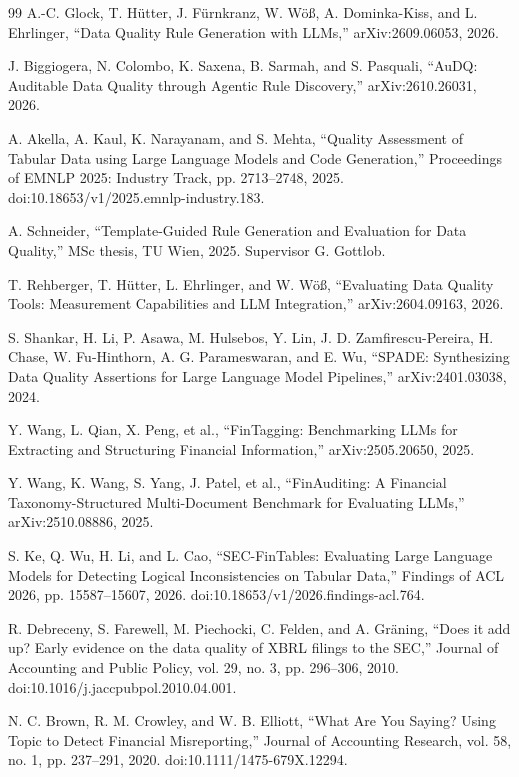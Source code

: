 \documentclass[11pt,a4paper]{article}
\begin{document}
\begin{thebibliography}{99}
 A.-C. Glock, T. H\"utter, J. F\"urnkranz, W. W\"o{\ss}, A. Dominka-Kiss, and L. Ehrlinger, ``Data Quality Rule Generation with LLMs,'' arXiv:2609.06053, 2026.

 J. Biggiogera, N. Colombo, K. Saxena, B. Sarmah, and S. Pasquali, ``AuDQ: Auditable Data Quality through Agentic Rule Discovery,'' arXiv:2610.26031, 2026.

 A. Akella, A. Kaul, K. Narayanam, and S. Mehta, ``Quality Assessment of Tabular Data using Large Language Models and Code Generation,'' Proceedings of EMNLP 2025: Industry Track, pp. 2713--2748, 2025. doi:10.18653/v1/2025.emnlp-industry.183.

 A. Schneider, ``Template-Guided Rule Generation and Evaluation for Data Quality,'' MSc thesis, TU Wien, 2025. Supervisor G. Gottlob.

 T. Rehberger, T. H\"utter, L. Ehrlinger, and W. W\"o{\ss}, ``Evaluating Data Quality Tools: Measurement Capabilities and LLM Integration,'' arXiv:2604.09163, 2026.

 S. Shankar, H. Li, P. Asawa, M. Hulsebos, Y. Lin, J. D. Zamfirescu-Pereira, H. Chase, W. Fu-Hinthorn, A. G. Parameswaran, and E. Wu, ``SPADE: Synthesizing Data Quality Assertions for Large Language Model Pipelines,'' arXiv:2401.03038, 2024.

 Y. Wang, L. Qian, X. Peng, et al., ``FinTagging: Benchmarking LLMs for Extracting and Structuring Financial Information,'' arXiv:2505.20650, 2025.

 Y. Wang, K. Wang, S. Yang, J. Patel, et al., ``FinAuditing: A Financial Taxonomy-Structured Multi-Document Benchmark for Evaluating LLMs,'' arXiv:2510.08886, 2025.

 S. Ke, Q. Wu, H. Li, and L. Cao, ``SEC-FinTables: Evaluating Large Language Models for Detecting Logical Inconsistencies on Tabular Data,'' Findings of ACL 2026, pp. 15587--15607, 2026. doi:10.18653/v1/2026.findings-acl.764.

 R. Debreceny, S. Farewell, M. Piechocki, C. Felden, and A. Gr\"aning, ``Does it add up? Early evidence on the data quality of XBRL filings to the SEC,'' Journal of Accounting and Public Policy, vol. 29, no. 3, pp. 296--306, 2010. doi:10.1016/j.jaccpubpol.2010.04.001.

 N. C. Brown, R. M. Crowley, and W. B. Elliott, ``What Are You Saying? Using Topic to Detect Financial Misreporting,'' Journal of Accounting Research, vol. 58, no. 1, pp. 237--291, 2020. doi:10.1111/1475-679X.12294.


\end{thebibliography}
\end{document}
